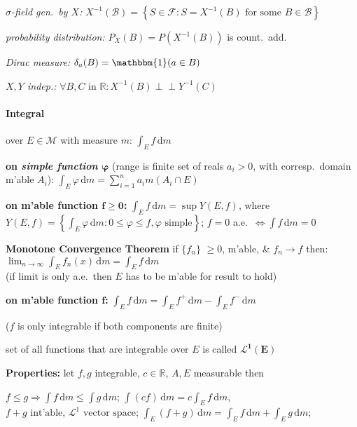 \documentclass[8pt,twoside]{extarticle}
\newcommand{\indep}{\perp \!\!\! \perp}
\begin{document}
\begin{multicols}{2}
\textit{$\sigma$-field gen.\ by $X$:} $X^{-1}(\mathcal{B}){=} \left\{S{\in}\mathcal{F}: S{=}X^{-1}(B) \text{ for some } B {\in} \mathcal{B}\right\}$

\textit{probability distribution:} $P_X(B) = P(X^{-1}(B))$ is count.\ add.\

\textit{Dirac measure:} $\delta_a(B) = \mathbbm{1}(a\in B)$

\textit{$X,Y$ indep.:} $\forall B,C \text{ in } \mathbb{R}:  X^{-1}(B) \indep Y^{-1}(C)$



\paragraph{Integral} over $E \in \mathcal{M}$ with measure $m$: $\int_E f \,\mathrm{d}m$

\textbf{on \textit{simple function} $\boldsymbol{\varphi}$} (range is finite set of reals $a_i>0$, with corresp.\ domain m'able $A_i$): $\int_E \varphi \,\mathrm{d}m = \sum_{i=1}^n a_i m(A_i\cap E)$

\textbf{on m'able function $\boldsymbol{f\geq 0}$:} $\int_E f \, \mathrm{d}m = \sup Y(E,f)$, where 
$Y(E,f)=\left\{ \int_E \varphi\,\mathrm{d}m:0{\leq} \varphi{\leq} f, \varphi \text{ simple}\right\}$; $f{=}0$ a.e.\ $\Leftrightarrow \int\! f \,\mathrm{d} m{=}0$


\textbf{Monotone Convergence Theorem} if $\{f_n\}$ $\geq 0$, m'able,  \& $f_n \to f$ then: $\lim_{n\to\infty}\int_E f_n(x)\, \mathrm{d}m = \int_E f\,\mathrm{d}m$ \\ (if limit is only a.e.\ then $E$ has to be m'able for result to hold)

\textbf{on m'able function $\boldsymbol{f}$:} $\int_E f\, \mathrm{d}m = \int_E f^+\, \mathrm{d}m - \int_E f^-\, \mathrm{d}m $

($f$ is only integrable if both components are finite)

set of all functions that are integrable over $E$ is called $\boldsymbol{\mathcal{L}^1(E)}$

\textbf{Properties:} let $f,g$ integrable, $c\in\mathbb{R}$, $A,E$ measurable then

$f\leq g \Rightarrow \int f \, \mathrm{d}m \leq \int g \, \mathrm{d}m$; 
$\int (cf) \, \mathrm{d}m = c \int_E f \, \mathrm{d}m$,
$f{+}g \text{ int'able, } \mathcal{L}^1 \text{ vector space}$; 
$\int_E (f{+}g) \, \mathrm{d}m {=} \int_E f \, \mathrm{d}m {+} \int_E g \, \mathrm{d}m$;


\end{multicols}
\end{document}
